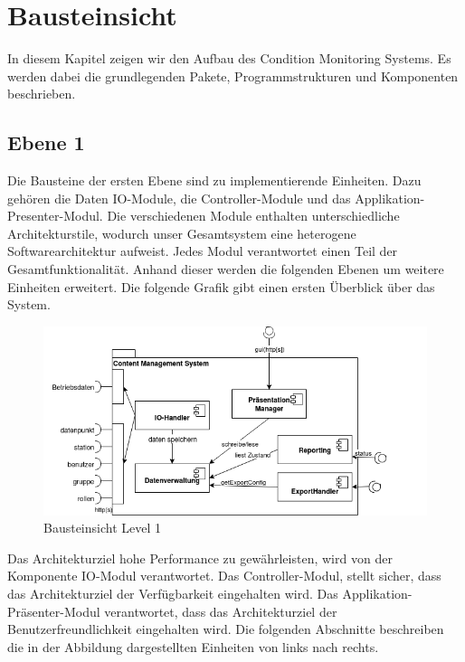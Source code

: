 \chapter{Bausteinsicht}
In diesem Kapitel zeigen wir den Aufbau des Condition Monitoring Systems. Es werden dabei die grundlegenden Pakete, Programmstrukturen und Komponenten beschrieben.
\section{Ebene 1}
Die Bausteine der ersten Ebene sind zu implementierende Einheiten. Dazu gehören die Daten IO-Module, die Controller-Module und das Applikation-Presenter-Modul. 
Die verschiedenen Module enthalten unterschiedliche Architekturstile, wodurch unser Gesamtsystem eine heterogene Softwarearchitektur aufweist. Jedes Modul verantwortet einen Teil der Gesamtfunktionalität. Anhand dieser werden die folgenden Ebenen um weitere Einheiten erweitert. Die folgende Grafik gibt einen ersten Überblick über das System.
\begin{figure}[h]
	\centering
	\includegraphics[width=1.0\textwidth]{Graphics/bausteinansicht_ebene_1.png}
	\caption{Bausteinsicht Level 1}
	\label{fig:bausteinsichtlvl1}
\end{figure}

Das Architekturziel hohe Performance zu gewährleisten, wird von der Komponente IO-Modul verantwortet.
Das Controller-Modul, stellt sicher, dass das Architekturziel der Verfügbarkeit eingehalten wird. 
Das Applikation-Präsenter-Modul verantwortet, dass das Architekturziel der Benutzerfreundlichkeit eingehalten wird.
Die folgenden Abschnitte beschreiben die in der Abbildung dargestellten Einheiten von links nach rechts.  
